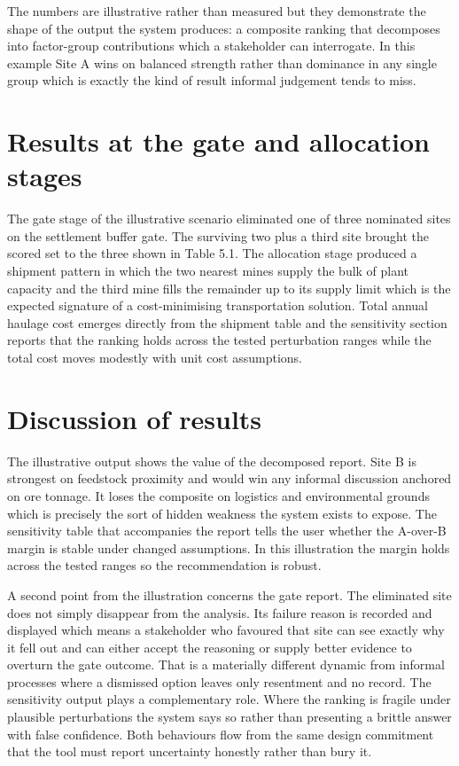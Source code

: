 \documentclass[12pt,a4paper]{report}
\begin{document}
The numbers are illustrative rather than measured but they demonstrate
the shape of the output the system produces: a composite ranking that
decomposes into factor-group contributions which a stakeholder can
interrogate. In this example Site A wins on balanced strength rather
than dominance in any single group which is exactly the kind of result
informal judgement tends to miss.

\section{Results at the gate and allocation stages}
The gate stage of the illustrative scenario eliminated one of three
nominated sites on the settlement buffer gate. The surviving two plus
a third site brought the scored set to the three shown in Table 5.1.
The allocation stage produced a shipment pattern in which the two
nearest mines supply the bulk of plant capacity and the third mine
fills the remainder up to its supply limit which is the expected
signature of a cost-minimising transportation solution. Total annual
haulage cost emerges directly from the shipment table and the
sensitivity section reports that the ranking holds across the tested
perturbation ranges while the total cost moves modestly with unit
cost assumptions.

\section{Discussion of results}
The illustrative output shows the value of the decomposed report. Site
B is strongest on feedstock proximity and would win any informal
discussion anchored on ore tonnage. It loses the composite on
logistics and environmental grounds which is precisely the sort of
hidden weakness the system exists to expose. The sensitivity table
that accompanies the report tells the user whether the A-over-B margin
is stable under changed assumptions. In this illustration the margin
holds across the tested ranges so the recommendation is robust.

A second point from the illustration concerns the gate report. The
eliminated site does not simply disappear from the analysis. Its
failure reason is recorded and displayed which means a stakeholder
who favoured that site can see exactly why it fell out and can either
accept the reasoning or supply better evidence to overturn the gate
outcome. That is a materially different dynamic from informal
processes where a dismissed option leaves only resentment and no
record. The sensitivity output plays a complementary role. Where the
ranking is fragile under plausible perturbations the system says so
rather than presenting a brittle answer with false confidence. Both
behaviours flow from the same design commitment that the tool must
report uncertainty honestly rather than bury it.
\end{document}

